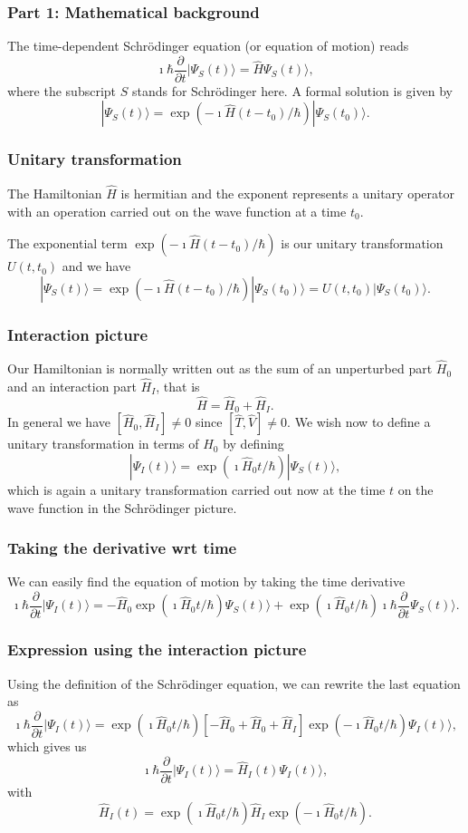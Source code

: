 \documentclass{beamer}
\begin{document}
\begin{frame}
\frametitle{Part 1: Mathematical background}

The time-dependent Schrödinger equation (or equation of motion) reads
\[
\imath \hbar\frac{\partial }{\partial t}|\Psi_S(t)\rangle = \hat{H}\Psi_S(t)\rangle,
\]
where the subscript $S$ stands for Schrödinger here.
A formal solution is given by 
\[
|\Psi_S(t)\rangle = \exp{(-\imath\hat{H}(t-t_0)/\hbar)}|\Psi_S(t_0)\rangle.
\]
\end{frame}

\begin{frame}
\frametitle{Unitary transformation}

The Hamiltonian $\hat{H}$ is hermitian and the exponent represents a unitary 
operator with an operation carried out on the wave function at a time $t_0$.

The exponential term $\exp{(-\imath\hat{H}(t-t_0)/\hbar)}$ is our
unitary transformation $U(t,t_0)$ and we have
\[
|\Psi_S(t)\rangle = \exp{(-\imath\hat{H}(t-t_0)/\hbar)}|\Psi_S(t_0)\rangle=U(t,t_0)|\Psi_S(t_0)\rangle.
\]
\end{frame}

\begin{frame}
\frametitle{Interaction picture}

Our Hamiltonian is normally written out as the sum of an unperturbed part $\hat{H}_0$ and an interaction part $\hat{H}_I$, that is
\[
\hat{H}=\hat{H}_0+\hat{H}_I.
\]
In general we have $[\hat{H}_0,\hat{H}_I]\ne 0$ since $[\hat{T},\hat{V}]\ne 0$.
We wish now to define a unitary transformation in terms of $\hat{H}_0$ by defining
\[
|\Psi_I(t)\rangle = \exp{(\imath\hat{H}_0t/\hbar)}|\Psi_S(t)\rangle,
\]
which is again a unitary transformation carried out now at the time $t$ on the 
wave function in the Schrödinger picture.
\end{frame}

\begin{frame}
\frametitle{Taking the derivative wrt time}

We can easily find the equation of motion by taking the time derivative
\[
\imath \hbar\frac{\partial }{\partial t}|\Psi_I(t)\rangle = -\hat{H}_0\exp{(\imath\hat{H}_0t/\hbar)}\Psi_S(t)\rangle+\exp{(\imath\hat{H}_0t/\hbar)}
\imath \hbar\frac{\partial }{\partial t}\Psi_S(t)\rangle.
\]
\end{frame}

\begin{frame}
\frametitle{Expression using the interaction picture}

Using the definition of the Schrödinger equation, we can rewrite the last equation as 
\[
\imath \hbar\frac{\partial }{\partial t}|\Psi_I(t)\rangle = \exp{(\imath\hat{H}_0t/\hbar)}\left[-\hat{H}_0+\hat{H}_0+\hat{H}_I\right]\exp{(-\imath\hat{H}_0t/\hbar)}\Psi_I(t)\rangle,
\]
which gives us
\[
\imath \hbar\frac{\partial }{\partial t}|\Psi_I(t)\rangle = \hat{H}_I(t)\Psi_I(t)\rangle,
\]
 with 
\[
\hat{H}_I(t)=
\exp{(\imath\hat{H}_0t/\hbar)}\hat{H}_I\exp{(-\imath\hat{H}_0t/\hbar)}.
\]
\end{frame}
\end{document}
